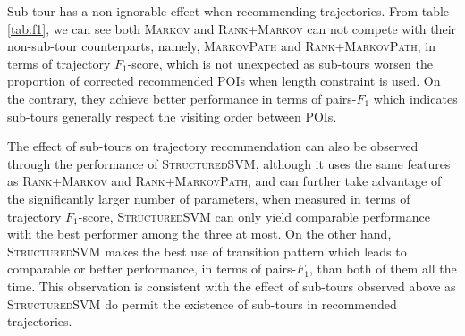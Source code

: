 Sub-tour has a non-ignorable effect when recommending trajectories.
From table \ref{tab:f1}, we can see both \textsc{Markov} and \textsc{Rank+Markov} can not compete with
their non-sub-tour counterparts, namely, \textsc{MarkovPath} and \textsc{Rank+MarkovPath},
in terms of trajectory $F_1$-score, which is not unexpected as sub-tours worsen the proportion of corrected
recommended POIs when length constraint is used.
On the contrary, they achieve better performance in terms of pairs-$F_1$ which indicates sub-tours generally
respect the visiting order between POIs.

The effect of sub-tours on trajectory recommendation can also be observed through the performance of \textsc{StructuredSVM},
%
although it uses the same features as \textsc{Rank+Markov} and \textsc{Rank+MarkovPath},
and can further take advantage of the significantly larger number of parameters,
when measured in terms of trajectory $F_1$-score, \textsc{StructuredSVM} can only yield comparable performance
with the best performer among the three at most.
On the other hand, \textsc{StructuredSVM} makes the best use of transition pattern which leads to comparable or
better performance, in terms of pairs-$F_1$, than both of them all the time.
This observation is consistent with the effect of sub-tours observed above
as \textsc{StructuredSVM} do permit the existence of sub-tours in recommended trajectories.

